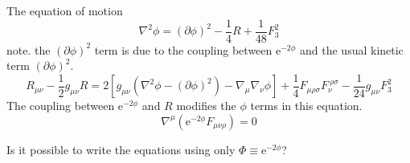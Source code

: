 The equation of motion
\begin{equation}
	\nabla^2 \phi =(\partial\phi)^2- \frac{1}{4}R + \frac{1}{48}F_3^2
\end{equation}
note. the $(\partial \phi)^2$ term is due to the coupling between $\mathrm{e}^{-2\phi}$ and the usual kinetic term $(\partial\phi)^2$.
\begin{equation}
	R_{\mu\nu} - \frac{1}{2} g_{\mu\nu} R = 
	2 \left[ g_{\mu\nu}(\nabla^2\phi - (\partial\phi)^2) - 
	\nabla_\mu \nabla_\nu\phi\right] 
	+ \frac{1}{4} F_{\mu\rho\sigma} F^{~\rho\sigma}_\nu
	-\frac{1}{24} g_{\mu\nu}F_3^2
\end{equation}
The coupling between $\mathrm{e}^{-2\phi}$ and $R$ modifies the $\phi$ terms in this equation.
\begin{equation}
	\nabla^\mu \left( \mathrm{e}^{-2\phi} F_{\mu\nu\rho} \right) =0
\end{equation}

\begin{question}
	Is it possible to write the equations using only $\Phi\equiv \mathrm{e}^{-2\phi}$?
\end{question}
